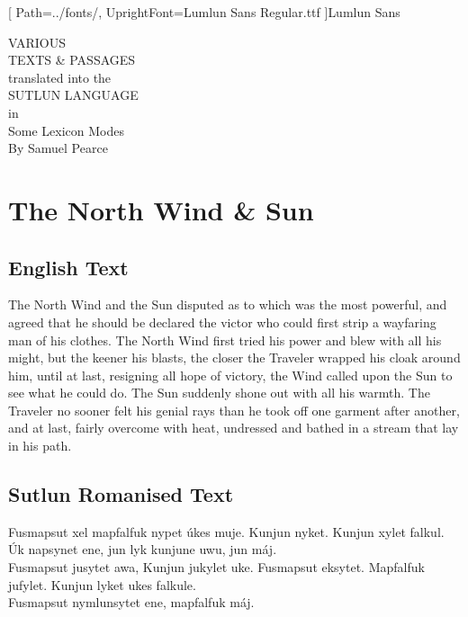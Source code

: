 \documentclass{book}
\begin{document}
\newfontfamily{\lmln}[
    Path=../fonts/,
    UprightFont=Lumlun Sans Regular.ttf
]{Lumlun Sans}

\newcommand{\ortho}[1]{{\lmln\Large{\raggedright#1}\par}}

\begingroup
\centering
\vfill
\Huge{VARIOUS}\\
\Huge{TEXTS \& PASSAGES}\\
\huge{translated into the}\\
\huge{SUTLUN LANGUAGE}\\
\large{in}\\
\Large{Some Lexicon Modes}\\
\vspace{3cm}
\Large{By Samuel Pearce}\\
\vfill\null
\endgroup
\thispagestyle{empty}

\tableofcontents
\pagebreak

\chapter{The North Wind \& Sun}
\section{English Text}

    The North Wind and the Sun disputed as to which was the most powerful,
    and agreed that he should be declared the victor who could first strip a wayfaring man of his clothes.
    The North Wind first tried his power and blew with all his might, but the keener his blasts,
    the closer the Traveler wrapped his cloak around him, until at last, resigning all hope of victory,
    the Wind called upon the Sun to see what he could do. The Sun suddenly shone out with all his warmth.
    The Traveler no sooner felt his genial rays than he took off one garment after another, and at last,
    fairly overcome with heat, undressed and bathed in a stream that lay in his path.

\section{Sutlun Romanised Text}

    Fusmapsut xel mapfalfuk nypet úkes muje. Kunjun nyket. Kunjun xylet falkul.\\
    Úk napsynet ene, jun lyk kunjune uwu, jun máj.\\
    Fusmapsut jusytet awa, Kunjun jukylet uke. Fusmapsut eksytet.
    Mapfalfuk jufylet. Kunjun lyket ukes falkule.\\
    Fusmapsut nymlunsytet ene, mapfalfuk máj.\\
\end{document}
